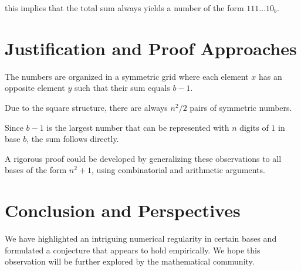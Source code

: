 \documentclass{article}
\begin{document}
this implies that the total sum always yields a number of the form $111\dots10_b$.

\section{Justification and Proof Approaches}

The numbers are organized in a symmetric grid where each element $x$ has an opposite element $y$ such that their sum equals $b - 1$.

Due to the square structure, there are always $n^2/2$ pairs of symmetric numbers.

Since $b - 1$ is the largest number that can be represented with $n$ digits of $1$ in base $b$, the sum follows directly.

A rigorous proof could be developed by generalizing these observations to all bases of the form $n^2 + 1$, using combinatorial and arithmetic arguments.

\section{Conclusion and Perspectives}

We have highlighted an intriguing numerical regularity in certain bases and formulated a conjecture that appears to hold empirically. We hope this observation will be further explored by the mathematical community.
\end{document}
